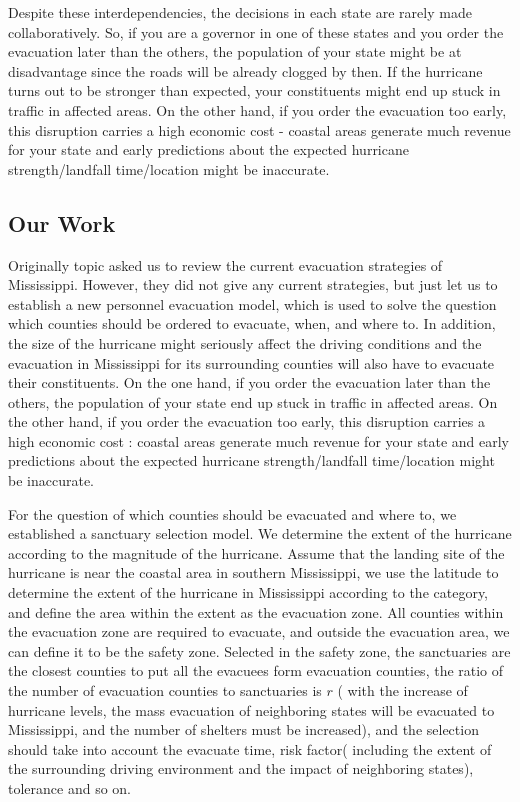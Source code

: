 \documentclass{mcmthesis}
\begin{document}
Despite these interdependencies, the decisions in each state are rarely made collaboratively. So, if you are a governor in one of these states and you order the evacuation later than the others, the population of your state might be at disadvantage since the roads will be already clogged by then. If the hurricane turns out to be stronger than expected, your constituents might end up stuck in traffic in affected areas. On the other hand, if you order the evacuation too early, this disruption carries a high economic cost - coastal areas generate much revenue for your state and early predictions about the expected hurricane strength/landfall time/location might be inaccurate.

\subsection{Our Work}

Originally topic asked us to review the current evacuation strategies of Mississippi. However, they did not give any current strategies, but just let us to establish a new personnel evacuation model, which is used to solve the question which counties should be ordered to evacuate, when, and where to. In addition, the size of the hurricane might seriously affect the driving conditions and the evacuation in Mississippi for its surrounding counties will also have to evacuate their constituents. On the one hand, if you order the evacuation later than the others, the population of your state end up stuck in traffic in affected areas. On the other hand, if you order the evacuation too early, this disruption carries a high economic cost : coastal areas generate much revenue for your state and early predictions about the expected hurricane strength/landfall time/location might be inaccurate.

For the question of which counties should be evacuated and where to, we established a sanctuary selection model. We determine the extent of the hurricane according to the magnitude of the hurricane. Assume that the landing site of the hurricane is near the coastal area in southern Mississippi, we use the latitude to determine the extent of the hurricane in Mississippi according to the category, and define the area within the extent as the evacuation zone. All counties within the evacuation zone are required to evacuate, and outside the evacuation area, we can define it to be the safety zone. Selected in the safety zone, the sanctuaries are the closest counties to put all the evacuees form evacuation counties, the ratio of the number of evacuation counties to sanctuaries is $r$ ( with the increase of hurricane levels, the mass evacuation of neighboring states will be evacuated to Mississippi, and the number of shelters must be increased), and the selection should take into account the evacuate time, risk factor( including the extent of the surrounding driving environment and the impact of neighboring states), tolerance and so on.
\end{document}
